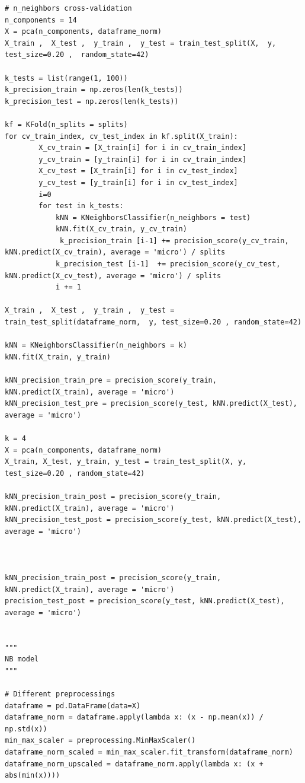 \documentclass[11pt,a4paper]{article}
\begin{document}
\begin{lstlisting}
# n_neighbors cross-validation
n_components = 14 
X = pca(n_components, dataframe_norm)
X_train ,  X_test ,  y_train ,  y_test = train_test_split(X,  y,  test_size=0.20 ,  random_state=42)

k_tests = list(range(1, 100))
k_precision_train = np.zeros(len(k_tests))
k_precision_test = np.zeros(len(k_tests))

kf = KFold(n_splits = splits)
for cv_train_index, cv_test_index in kf.split(X_train):
        X_cv_train = [X_train[i] for i in cv_train_index]
        y_cv_train = [y_train[i] for i in cv_train_index]
        X_cv_test = [X_train[i] for i in cv_test_index]
        y_cv_test = [y_train[i] for i in cv_test_index]
        i=0
        for test in k_tests:
            kNN = KNeighborsClassifier(n_neighbors = test)
            kNN.fit(X_cv_train, y_cv_train) 
             k_precision_train [i-1] += precision_score(y_cv_train, kNN.predict(X_cv_train), average = 'micro') / splits
            k_precision_test [i-1]  += precision_score(y_cv_test, kNN.predict(X_cv_test), average = 'micro') / splits
            i += 1

X_train ,  X_test ,  y_train ,  y_test = train_test_split(dataframe_norm,  y, test_size=0.20 , random_state=42)

kNN = KNeighborsClassifier(n_neighbors = k)
kNN.fit(X_train, y_train)

kNN_precision_train_pre = precision_score(y_train, kNN.predict(X_train), average = 'micro')
kNN_precision_test_pre = precision_score(y_test, kNN.predict(X_test), average = 'micro')

k = 4 
X = pca(n_components, dataframe_norm)
X_train, X_test, y_train, y_test = train_test_split(X, y, test_size=0.20 , random_state=42)

kNN_precision_train_post = precision_score(y_train, kNN.predict(X_train), average = 'micro')
kNN_precision_test_post = precision_score(y_test, kNN.predict(X_test), average = 'micro')



kNN_precision_train_post = precision_score(y_train, kNN.predict(X_train), average = 'micro')
precision_test_post = precision_score(y_test, kNN.predict(X_test), average = 'micro')


"""
NB model
"""

# Different preprocessings
dataframe = pd.DataFrame(data=X)
dataframe_norm = dataframe.apply(lambda x: (x - np.mean(x)) / np.std(x))
min_max_scaler = preprocessing.MinMaxScaler()
dataframe_norm_scaled = min_max_scaler.fit_transform(dataframe_norm)
dataframe_norm_upscaled = dataframe_norm.apply(lambda x: (x + abs(min(x))))


\end{lstlisting}
\end{document}
